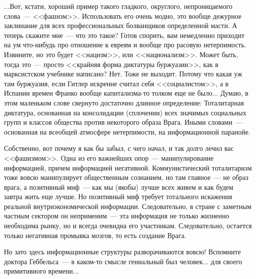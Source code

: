 \documentclass{scrbook}
\newcommand{\flqq}{<<}
\newcommand{\frqq}{>>}
\newcommand{\mdash}{~--- }
\begin{document}
...Вот, кстати, хороший пример такого гладкого, округлого, непроницаемого слова{\mdash}{\flqq}фашизм{\frqq}. Использовать его очень модно, это вообще дежурное заклинание для всех профессиональных болванщиков определенной масти. А теперь скажите мне{\mdash}что это такое? Готов спорить, вам немедленно приходит на ум что-нибудь про отношение к евреям и вообще про расовую нетерпимость. Извините, но это будет {\flqq}нацизм{\frqq}, или {\flqq}национализм{\frqq}. Может быть, тогда это{\mdash}просто {\flqq}крайняя форма диктатуры буржуазии{\frqq}, как в марксистском учебнике написано? Нет. Тоже не выходит. Потому что какая уж там буржуазия, если Гитлер искренне считал себя {\flqq}социалистом{\frqq}, а в Испании времен Франко вообще капитализма-то толком еще не было... Думаю, в этом маленьком слове свернуто достаточно длинное определение: Тоталитарная диктатура, основанная на консолидации (сплочении) всех значимых социальных групп и классов общества против некоторого образа Врага. Иными словами{\mdash}основанная на всеобщей атмосфере нетерпимости, на информационной паранойе.

Собственно, вот почему я как бы забыл, с чего начал, и так долго лечил вас {\flqq}фашизмом{\frqq}. Одна из его важнейших опор{\mdash}манипулирование информацией, причем информацией негативной. Коммунистический тоталитаризм тоже вовсю манипулирует общественным сознанием, но там главное{\mdash}не образ врага, а позитивный миф{\mdash}как мы (якобы) лучше всех живем и как будем завтра жить еще лучше. Но позитивный миф требует тотального искажения реальной внутриэкономической информации. Следовательно, в стране с заметным частным сектором он неприменим{\mdash}эта информация не только жизненно необходима рынку, но и всегда очевидна его участникам. Следовательно, остается только негативная промывка мозгов, то есть создание Врага.

Но зато здесь информационные структуры разворачиваются вовсю! Вспомните доктора Геббельса{\mdash}в каком-то смысле гениальный был человек... для своего примитивного времени...
\end{document}
